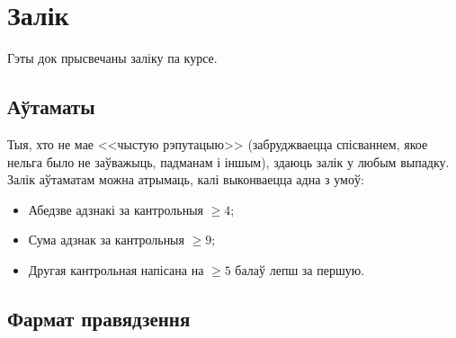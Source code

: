 

\renewcommand{\ge}{\geqslant}


    \section{Залік}
    Гэты док прысвечаны заліку па курсе.
    
    \subsection{Аўтаматы}
    Тыя, хто не мае <<чыстую рэпутацыю>> (забруджваецца спісваннем, якое нельга было не заўважыць, падманам і іншым), здаюць залік у любым выпадку.
    Залік аўтаматам можна атрымаць, калі выконваецца адна з умоў:
    \begin{itemize}
        \item Абедзве адзнакі за кантрольныя $\ge 4$;
        \item Сума адзнак за кантрольныя $\ge 9$;
        \item Другая кантрольная напісана на $\ge 5$ балаў лепш за першую.
    \end{itemize}

    \subsection{Фармат правядзення}
    

